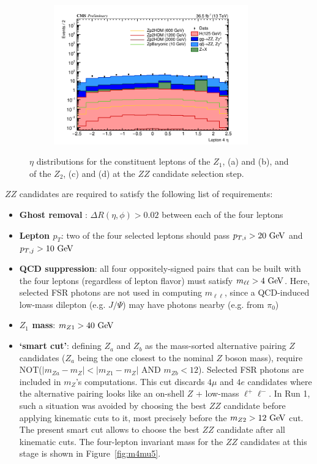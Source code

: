 \begin{enumerate}
\begin{figure}[tbh]
\begin{subfigure}{0.50\textwidth}
\caption{}
\end{subfigure}
\begin{subfigure}{0.50\textwidth}
\centering
\includegraphics[width=3.3in]{figures/hist_hEtaLep4_5.png}
\caption{}
\end{subfigure}
\caption{$\eta$ distributions for the constituent leptons of the $Z_1$, (a) and (b), and of the $Z_2$, (c) and (d) at the $ZZ$ candidate selection step.}
\label{fig:lep5kin2}
\end{figure}


$ZZ$ candidates are required to satisfy the following list of requirements:
  \begin{itemize} 
  \item {\bf Ghost removal }: $\Delta R(\eta,\phi) > 0.02$ between each of the four leptons
  \item {\bf Lepton $p_T$}: two of the four selected leptons should pass 
     $p_{T,i} > 20~\mathrm{Ge\kern -0.1em V}$ and $p_{T,j} > 10~\mathrm{Ge\kern -0.1em V}$
  \item {\bf QCD suppression}: all four oppositely-signed pairs that can
     be built with the four leptons (regardless of lepton flavor)
     must satisfy $m_{\ell\ell} > 4~\mathrm{Ge\kern -0.1em V}$.
     Here, selected FSR photons are not used in computing $m_{\ell\ell}$, 
     since a QCD-induced low-mass dilepton (e.g. $J/\Psi$) 
     may have photons nearby (e.g. from $\pi_0$)
  \item {\bf $Z_1$ mass}: $m_{Z1} > 40~\mathrm{Ge\kern -0.1em V}$
  \item {\bf `smart cut'}: defining $Z_a$ and $Z_b$ as 
     the mass-sorted alternative pairing $Z$ candidates 
     ($Z_a$ being the one closest to the nominal $Z$ boson mass),
     require NOT($|m_{ Za}-m_{ Z}| < |m_{ Z1}-m_{ Z}|$ AND $m_{ Zb}<12$).
     Selected FSR photons are included in $m_{ Z}$'s computations.
     This cut discards $4\mu$ and $4e$ candidates where the alternative pairing
     looks like an on-shell $Z$ + low-mass $\ell^+ \ell^-$. 
     In Run 1, such a situation was avoided by choosing the best $ZZ$ candidate
     before applying kinematic cuts to it, most precisely before the $m_{Z2} > 12~\mathrm{Ge\kern -0.1em V}$ cut.
     The present smart cut allows to choose the best $ZZ$ candidate after all kinematic cuts.
The four-lepton invariant mass for the $ZZ$ candidates at this stage is shown in Figure~\ref{fig:m4mu5}.   


\end{itemize}
\end{enumerate}
